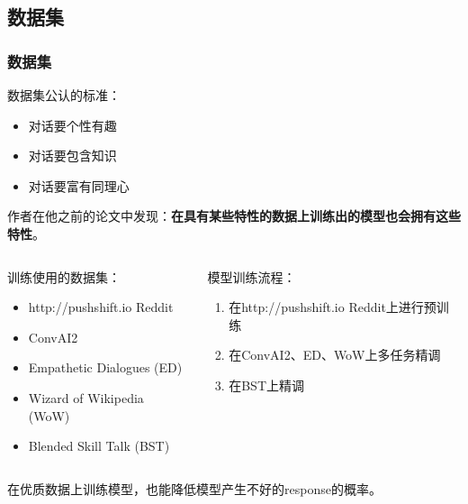 \documentclass{beamer}
\begin{document}
\subsection{数据集}
\begin{frame}
    \frametitle{数据集}

    数据集公认的标准：

    \begin{itemize}
        \item 对话要个性有趣
        \item 对话要包含知识
        \item 对话要富有同理心
    \end{itemize}

    作者在他之前的论文中发现：\textbf{在具有某些特性的数据上训练出的模型也会拥有这些特性}。

    \begin{columns}
        \begin{column}{.5\textwidth}
            训练使用的数据集：
            \begin{itemize}
                \item http://pushshift.io Reddit
                \item ConvAI2
                \item Empathetic Dialogues (ED)
                \item Wizard of Wikipedia (WoW)
                \item Blended Skill Talk (BST)
            \end{itemize}
        \end{column}
        \begin{column}{.5\textwidth}
            模型训练流程：
            \begin{enumerate}
                \item 在http://pushshift.io Reddit上进行预训练
                \item 在ConvAI2、ED、WoW上多任务精调
                \item 在BST上精调
            \end{enumerate}
        \end{column}
    \end{columns}

    在优质数据上训练模型，也能降低模型产生不好的response的概率。
\end{frame}
\end{document}
